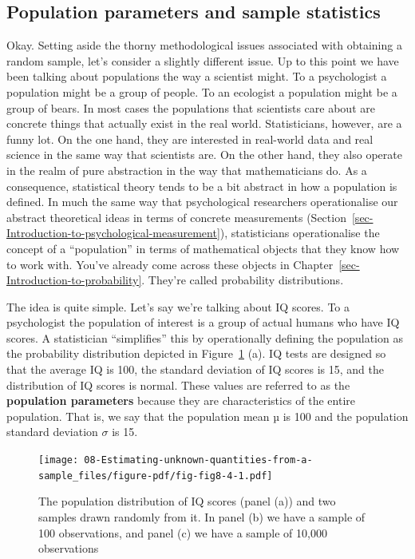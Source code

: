 \documentclass[
  a4paper,
]{book}
\begin{document}
\hypertarget{population-parameters-and-sample-statistics}{%
\subsection{Population parameters and sample
statistics}\label{population-parameters-and-sample-statistics}}

Okay. Setting aside the thorny methodological issues associated with
obtaining a random sample, let's consider a slightly different issue. Up
to this point we have been talking about populations the way a scientist
might. To a psychologist a population might be a group of people. To an
ecologist a population might be a group of bears. In most cases the
populations that scientists care about are concrete things that actually
exist in the real world. Statisticians, however, are a funny lot. On the
one hand, they are interested in real-world data and real science in the
same way that scientists are. On the other hand, they also operate in
the realm of pure abstraction in the way that mathematicians do. As a
consequence, statistical theory tends to be a bit abstract in how a
population is defined. In much the same way that psychological
researchers operationalise our abstract theoretical ideas in terms of
concrete measurements
(Section~\ref{sec-Introduction-to-psychological-measurement}),
statisticians operationalise the concept of a ``population'' in terms of
mathematical objects that they know how to work with. You've already
come across these objects in
Chapter~\ref{sec-Introduction-to-probability}. They're called
probability distributions.

The idea is quite simple. Let's say we're talking about IQ scores. To a
psychologist the population of interest is a group of actual humans who
have IQ scores. A statistician ``simplifies'' this by operationally
defining the population as the probability distribution depicted in
Figure~\ref{fig-fig8-4} (a). IQ tests are designed so that the average
IQ is 100, the standard deviation of IQ scores is 15, and the
distribution of IQ scores is normal. These values are referred to as the
\textbf{population parameters} because they are characteristics of the
entire population. That is, we say that the population mean µ is 100 and
the population standard deviation \(\sigma\) is 15.

\begin{figure}

\texttt{[image: 08-Estimating-unknown-quantities-from-a-sample\_files/figure-pdf/fig-fig8-4-1.pdf]} \hfill{}

\caption{\label{fig-fig8-4}The population distribution of IQ scores
(panel (a)) and two samples drawn randomly from it. In panel (b) we have
a sample of 100 observations, and panel (c) we have a sample of 10,000
observations}

\end{figure}
\end{document}
